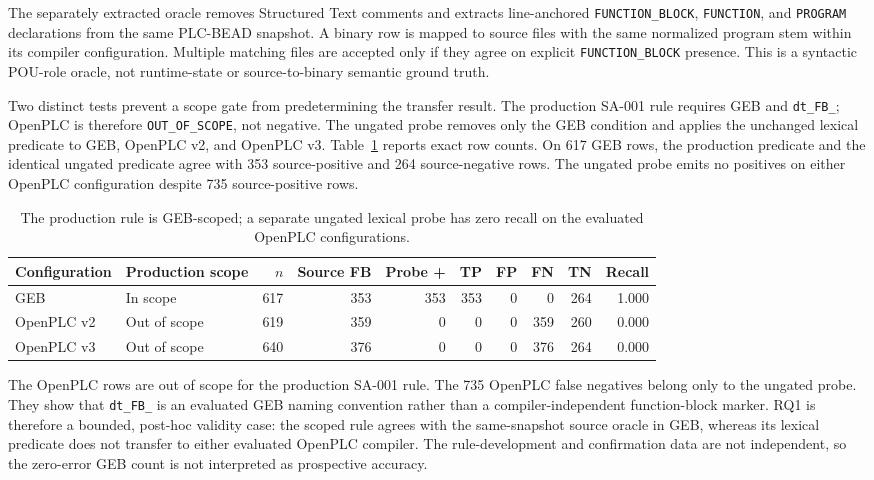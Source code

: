 \documentclass[manuscript,screen,review]{acmart}
\begin{document}
The separately extracted oracle removes Structured Text comments and extracts line-anchored \texttt{FUNCTION\_BLOCK}, \texttt{FUNCTION}, and \texttt{PROGRAM} declarations from the same PLC-BEAD snapshot. A binary row is mapped to source files with the same normalized program stem within its compiler configuration. Multiple matching files are accepted only if they agree on explicit \texttt{FUNCTION\_BLOCK} presence. This is a syntactic POU-role oracle, not runtime-state or source-to-binary semantic ground truth.

Two distinct tests prevent a scope gate from predetermining the transfer result. The production SA-001 rule requires GEB and \texttt{dt\_FB\_}; OpenPLC is therefore \texttt{OUT\_OF\_SCOPE}, not negative. The ungated probe removes only the GEB condition and applies the unchanged lexical predicate to GEB, OpenPLC v2, and OpenPLC v3. Table~\ref{tab:source_oracle} reports exact row counts. On 617 GEB rows, the production predicate and the identical ungated predicate agree with 353 source-positive and 264 source-negative rows. The ungated probe emits no positives on either OpenPLC configuration despite 735 source-positive rows.

\begin{table}[t]
\centering
\small
\caption{The production rule is GEB-scoped; a separate ungated lexical probe has zero recall on the evaluated OpenPLC configurations.}
\label{tab:source_oracle}
\begin{tabularx}{\textwidth}{>{\raggedright\arraybackslash}X>{\raggedright\arraybackslash}p{}rrrrrrrr}
\toprule
Configuration & Production scope & $n$ & Source FB & Probe + & TP & FP & FN & TN & Recall \\
\midrule
GEB & In scope & 617 & 353 & 353 & 353 & 0 & 0 & 264 & 1.000 \\
OpenPLC v2 & Out of scope & 619 & 359 & 0 & 0 & 0 & 359 & 260 & 0.000 \\
OpenPLC v3 & Out of scope & 640 & 376 & 0 & 0 & 0 & 376 & 264 & 0.000 \\
\bottomrule
\end{tabularx}
\end{table}

The OpenPLC rows are out of scope for the production SA-001 rule. The 735 OpenPLC false negatives belong only to the ungated probe. They show that \texttt{dt\_FB\_} is an evaluated GEB naming convention rather than a compiler-independent function-block marker. RQ1 is therefore a bounded, post-hoc validity case: the scoped rule agrees with the same-snapshot source oracle in GEB, whereas its lexical predicate does not transfer to either evaluated OpenPLC compiler. The rule-development and confirmation data are not independent, so the zero-error GEB count is not interpreted as prospective accuracy.
\end{document}
